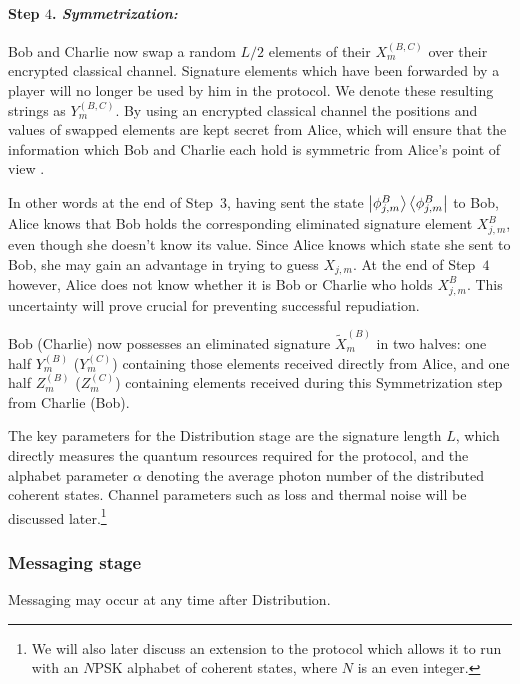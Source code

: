 \paragraph{Step $4$. \emph{Symmetrization:}}
Bob and Charlie now swap a random $L/2$ elements of their $X_m^{\left(B, C\right)}$ over their encrypted classical channel. Signature elements which have been forwarded by a player will no longer be used by him in the protocol. We denote these resulting strings as $Y_m^{\left(B, C\right)}$. By using an encrypted classical channel the positions and values of swapped elements are kept secret from Alice, which will ensure that the information which Bob and Charlie each hold is symmetric from Alice's point of view \cite{Dunjko2014, Wallden2015}. 

In other words at the end of Step~$3$, having sent the state $\ket{\phi_{j, m}^B}\bra{\phi_{j, m}^B}$ to Bob, Alice knows that Bob holds the corresponding eliminated signature element $X_{j, m}^B$, even though she doesn't know its value. Since Alice knows which state she sent to Bob, she may gain an advantage in trying to guess $X_{j, m}$. At the end of Step~$4$ however, Alice does not know whether it is Bob or Charlie who holds $X_{j, m}^B$. This uncertainty will prove crucial for preventing successful repudiation.

Bob (Charlie) now possesses an eliminated signature $\tilde{X}_m^{\left(B\right)}$ in two halves: one half $Y_m^{\left(B\right)}$ ($Y_m^{\left(C\right)}$) containing those elements received directly from Alice, and one half $Z_m^{\left(B\right)}$ ($Z_m^{\left(C\right)}$) containing elements received during this Symmetrization step from Charlie (Bob).

The key parameters for the Distribution stage are the signature length $L$, which directly measures the quantum resources required for the protocol, and the alphabet parameter $\alpha$ denoting the average photon number of the distributed coherent states. Channel parameters such as loss and thermal noise will be discussed later.\footnote{We will also later discuss an extension to the protocol which allows it to run with an $N$PSK alphabet of coherent states, where $N$ is an even integer.}

\subsubsection{Messaging stage}

Messaging may occur at any time after Distribution.

